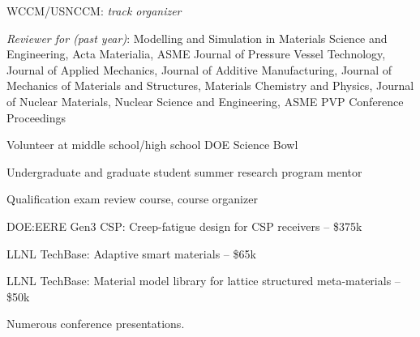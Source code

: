 WCCM/USNCCM:  \emph{track organizer} 

\emph{Reviewer for (past year)}:   
Modelling and Simulation in Materials Science and Engineering,
Acta Materialia,
ASME Journal of Pressure Vessel Technology,
Journal of Applied Mechanics,
Journal of Additive Manufacturing, 
Journal of Mechanics of Materials and Structures,
Materials Chemistry and Physics,
Journal of Nuclear Materials,
Nuclear Science and Engineering,
ASME PVP Conference Proceedings 


Volunteer at middle school/high school DOE Science Bowl 

Undergraduate and graduate student summer research program mentor 

Qualification exam review course, course organizer 


DOE:EERE Gen3 CSP: Creep-fatigue design for CSP receivers -- \$375k 

LLNL TechBase: Adaptive smart materials -- \$65k 

LLNL TechBase: Material model library for lattice structured meta-materials
-- \$50k 

\extra


\nocite{*}


\printbibliography[keyword=refereed,heading=none]


\printbibliography[keyword=pending,heading=none]


\printbibliography[keyword=conf,heading=none]


\printbibliography[keyword=patents,heading=none]


\printbibliography[keyword=nonref,heading=none]


\printbibliography[keyword=invited,heading=none]

Numerous conference presentations.


